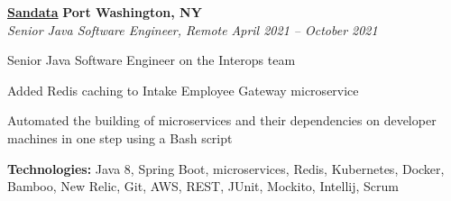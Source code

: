 %
    \headerrow
        {\textbf{\href{https://www.sandata.com/}{Sandata}}}
        {\textbf{Port Washington, NY}}
    \\
    \headerrow
        {\emph{Senior Java Software Engineer, Remote}}
        {\emph{April 2021 -- October 2021}}
    \begin{itemize*}
        \item Senior Java Software Engineer on the Interops team
        \item Added Redis caching to Intake Employee Gateway microservice
        \item Automated the building of microservices and their dependencies on developer machines in one step using a Bash script
    \end{itemize*}

    \hspace{1.0em}
        {\textbf{Technologies:} Java 8, Spring Boot, microservices, Redis, Kubernetes, Docker, Bamboo, New Relic,
        Git, AWS, REST, JUnit, Mockito, Intellij, Scrum}

